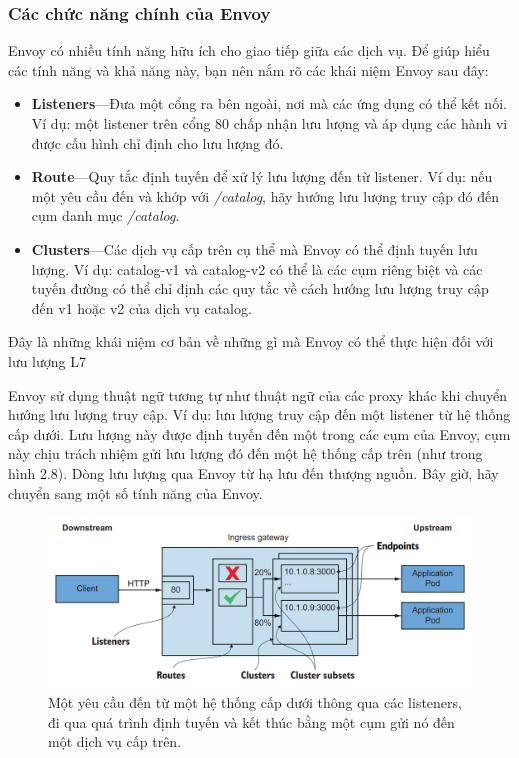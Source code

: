 \documentclass[14pt,a4paper]{book}
\begin{document}
			\subsubsection{Các chức năng chính của Envoy}
		\hspace{0.6cm}Envoy có nhiều tính năng hữu ích cho giao tiếp giữa các dịch vụ. Để giúp hiểu các tính năng và khả năng này, bạn nên nắm rõ các khái niệm Envoy sau đây:
		\begin{itemize}
			\item \textbf{Listeners}—Đưa một cổng ra bên ngoài, nơi mà các ứng dụng có thể kết nối. Ví dụ: một listener trên cổng 80 chấp nhận lưu lượng và áp dụng các hành vi được cấu hình chỉ định cho lưu lượng đó.
			\item \textbf{Route}—Quy tắc định tuyến để xử lý lưu lượng đến từ listener. Ví dụ: nếu một yêu cầu đến và khớp với \textit{/catalog}, hãy hướng lưu lượng truy cập đó đến cụm danh mục \textit{/catalog}.
			\item \textbf{Clusters}—Các dịch vụ cấp trên cụ thể mà Envoy có thể định tuyến lưu lượng. Ví dụ: catalog-v1 và catalog-v2 có thể là các cụm riêng biệt và các tuyến đường có thể chỉ định các quy tắc về cách hướng lưu lượng truy cập đến v1 hoặc v2 của dịch vụ catalog.
		\end{itemize}
		
		Đây là những khái niệm cơ bản về những gì mà Envoy có thể thực hiện đối với lưu lượng L7
		
		Envoy sử dụng thuật ngữ tương tự như thuật ngữ của các proxy khác khi chuyển hướng lưu lượng truy cập. Ví dụ: lưu lượng truy cập đến một listener từ hệ thống cấp dưới. Lưu lượng này được định tuyến đến một trong các cụm của Envoy, cụm này chịu trách nhiệm gửi lưu lượng đó đến một hệ thống cấp trên (như trong hình 2.8). Dòng lưu lượng qua Envoy từ hạ lưu đến thượng nguồn. Bây giờ, hãy chuyển sang một số tính năng của Envoy.
		\begin{figure}[h]
			\centering
			\includegraphics[width=0.9\linewidth]{Pics/2.1.3-p3}
			\caption{Một yêu cầu đến từ một hệ thống cấp dưới thông qua các listeners, đi qua quá trình định tuyến và kết thúc bằng một cụm gửi nó đến một dịch vụ cấp trên.}
			\label{fig:2.1.3-3}
		\end{figure}
	
\end{document}
